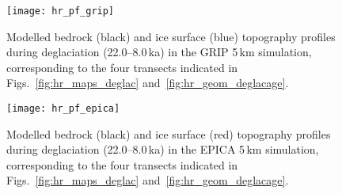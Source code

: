 \documentclass[tc, manuscript]{copernicus}
\begin{document}
\begin{figure}%
\texttt{[image: hr\_pf\_grip]}
\caption{%
      Modelled bedrock (black) and ice surface (blue) topography profiles
      during deglaciation (22.0--8.0\,\unit{ka}) in the GRIP 5\,\unit{km}
      simulation, corresponding to the four transects indicated in
      Figs.~\ref{fig:hr_maps_deglac}
      and~\ref{fig:hr_geom_deglacage}.}
\label{fig:hr_pf_grip}%
\end{figure}%


\begin{figure}%
\texttt{[image: hr\_pf\_epica]}
\caption{%
      Modelled bedrock (black) and ice surface (red) topography profiles
      during deglaciation (22.0--8.0\,\unit{ka}) in the EPICA 5\,\unit{km}
      simulation, corresponding to the four transects indicated in
      Figs.~\ref{fig:hr_maps_deglac}
      and~\ref{fig:hr_geom_deglacage}.}
\label{fig:hr_pf_epica}%
\end{figure}
\end{document}
